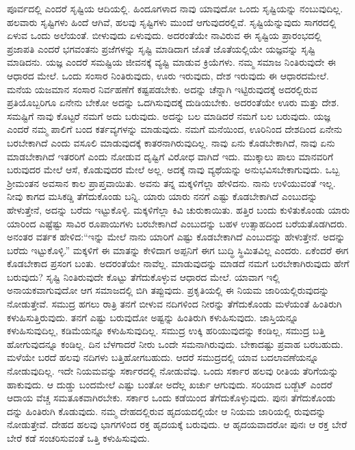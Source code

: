 ಪೂರ್ವದಲ್ಲಿ ಎಂದರೆ ಸೃಷ್ಟಿಯ ಆದಿಯಲ್ಲಿ. ಹಿಂದೂಗಳಾದ ನಾವು ಯಾವುದೋ ಒಂದು ಸೃಷ್ಟಿಯನ್ನು ನಂಬುವುದಿಲ್ಲ. ಹಲವಾರು ಸೃಷ್ಟಿಗಳು ಹಿಂದೆ ಆಗಿವೆ, ಹಲವು ಸೃಷ್ಟಿಗಳು ಮುಂದೆ ಆಗುವುದರಲ್ಲಿವೆ. ಸೃಷ್ಟಿಯೆನ್ನುವುದು ಸಾಗರದಲ್ಲಿ ಏಳುವ ಒಂದು ಅಲೆಯಂತೆ. ಬೀಳುವುದು ಏಳುವುದು. ಅದರಂತೆಯೇ ನಾವಿರುವ ಈ ಸೃಷ್ಟಿಯ ಪ್ರಾರಂಭದಲ್ಲಿ ಪ್ರಜಾಪತಿ ಎಂದರೆ ಭಗವಂತನು ಪ್ರಜೆಗಳನ್ನು ಸೃಷ್ಟಿ ಮಾಡಿದಾಗ ಜೊತೆ ಜೊತೆಯಲ್ಲಿಯೇ ಯಜ್ಞವನ್ನು ಸೃಷ್ಟಿ ಮಾಡಿದನು. ಯಜ್ಞ ಎಂದರೆ ಸಮಷ್ಟಿಯ ಜೀವನಕ್ಕೆ ವ್ಯಷ್ಟಿ ಮಾಡುವ ಕ್ರಿಯೆಗಳು. ನಮ್ಮ ಸಮಾಜ ನಿಂತಿರುವುದೇ ಈ ಆಧಾರದ ಮೇಲೆ. ಒಂದು ಸಂಸಾರ ನಿಂತಿರುವುದು, ಊರು ಇರುವುದು, ದೇಶ ಇರುವುದು ಈ ಆಧಾರದಮೇಲೆ. ಮನೆಯ ಯಜಮಾನ ಸಂಸಾರ ನಿರ್ವಹಣೆಗೆ ಕಷ್ಟಪಡಬೇಕು. ಅದನ್ನು ಚೆನ್ನಾಗಿ ಇಟ್ಟಿರುವುದಕ್ಕೆ ಅದರಲ್ಲಿರುವ ಪ್ರತಿಯೊಬ್ಬರಿಗೂ ಏನೇನು ಬೇಕೋ ಅದನ್ನು ಒದಗಿಸುವುದಕ್ಕೆ ದುಡಿಯಬೇಕು. ಅದರಂತೆಯೇ ಊರು ಮತ್ತು ದೇಶ. ಸಮಷ್ಟಿಗೆ ನಾವು ಕೊಟ್ಟರೆ ನಮಗೆ ಅದು ಬರುವುದು. ಅದನ್ನು ಬಲ ಮಾಡಿದರೆ ನಮಗೆ ಬಲ ಬರುವುದು. ಯಜ್ಞ ಎಂದರೆ ನಮ್ಮ ಪಾಲಿಗೆ ಬಂದ ಕರ್ತವ್ಯಗಳನ್ನು ಮಾಡುವುದು. ನಮಗೆ ಮನೆಯಿಂದ, ಊರಿನಿಂದ ದೇಶದಿಂದ ಏನೇನು ಬರಬೇಕಾಗಿದೆ ಎಂದು ವಸೂಲಿ ಮಾಡುವುದಕ್ಕೆ ಕಾತರನಾಗಿರುವುದಿಲ್ಲ. ನಾವು ಏನು ಕೊಡಬೇಕಾಗಿದೆ, ನಾವು ಏನು ಮಾಡಬೇಕಾಗಿದೆ ಇತರರಿಗೆ ಎಂದು ನೋಡುವ ದೃಷ್ಟಿಗೆ ವಿರೋಧ ವಾಗಿದೆ ಇದು. ಮುಕ್ಕಾಲು ಪಾಲು ಮಾನವರಿಗೆ ಬರುವುದರ ಮೇಲೆ ಆಸೆ, ಕೊಡುವುದರ ಮೇಲೆ ಅಲ್ಲ. ಅದಕ್ಕೆ ನಾವು ವ್ಯಥೆಯನ್ನು ಅನುಭವಿಸಬೇಕಾಗುವುದು. ಒಬ್ಬ ಶ್ರೀಮಂತನ ಅವಸಾನ ಕಾಲ ಪ್ರಾಪ್ತವಾಯಿತು. ಅವನು ತನ್ನ ಮಕ್ಕಳಿಗೆಲ್ಲಾ ಹೇಳಿದನು. ನಾನು ಉಳಿಯುವಂತೆ ಇಲ್ಲ. ನೀವು ಕಾಗದ ಮಸಿಕಡ್ಡಿ ತೆಗೆದುಕೊಂಡು ಬನ್ನಿ. ಯಾರು ಯಾರು ನನಗೆ ಎಷ್ಟು ಕೊಡಬೇಕಾಗಿದೆ ಎಂಬುದನ್ನು ಹೇಳುತ್ತೇನೆ, ಅದನ್ನು ಬರೆದು ಇಟ್ಟುಕೊಳ್ಳಿ. ಮಕ್ಕಳಿಗೆಲ್ಲಾ ಕಿವಿ ಚುರುಕಾಯಿತು. ಹತ್ತಿರ ಬಂದು ಕುಳಿತುಕೊಂಡು ಯಾರು ಯಾರಿಂದ ಎಷ್ಟೆಷ್ಟು ಸಾವಿರ ರೂಪಾಯಿಗಳು ಬರಬೇಕಾಗಿದೆ ಎಂಬುದನ್ನು ಬಹಳ ಉತ್ಸಾಹದಿಂದ ಬರೆಯತೊಡಗಿದರು. ಅನಂತರ ವರ್ತಕ ಹೇಳಿದ:“ಇನ್ನು ಮೇಲೆ ನಾನು ಯಾರಿಗೆ ಎಷ್ಟು ಕೊಡಬೇಕಾಗಿದೆ ಎಂಬುದನ್ನು ಹೇಳುತ್ತೇನೆ. ಅದನ್ನು ಬರೆದು ಇಟ್ಟುಕೊಳ್ಳಿ.” ಮಕ್ಕಳಿಗೆ ಈ ಮಾತನ್ನು ಕೇಳಿದಾಗ ಅಪ್ಪನಿಗೆ ಈಗ ಬುದ್ಧಿ ಸ್ಥಿಮಿತವಿಲ್ಲ ಎಂದರು. ಏಕೆಂದರೆ ಈಗ ಕೊಡಬೇಕಾದ ಪ್ರಸಂಗ ಬಂತು. ಅದರಂತೆಯೇ ನಾವೆಲ್ಲ. ಮಾಡುವುದನ್ನು ಮಾಡದೆ ನಮಗೆ ಬರಬೇಕಾಗಿರುವುದು ಹೇಗೆ ಬರುವುದು? ಸೃಷ್ಟಿ ನಿಂತಿರುವುದೇ ಕೊಟ್ಟು ತೆಗೆದುಕೊಳ್ಳುವ ಆಧಾರದ ಮೇಲೆ. ಯಾವಾಗ ಇಲ್ಲಿ ಅನಾಯಕವಾಗುವುದೋ ಆಗ ಸಮಾಜದಲ್ಲಿ ಬಿಗಿ ತಪ್ಪುವುದು. ಪ್ರಕೃತಿಯಲ್ಲಿ ಈ ನಿಯಮ ಜಾರಿಯಲ್ಲಿರುವುದನ್ನು ನೋಡುತ್ತೇವೆ. ಸಮುದ್ರ ಹಗಲು ರಾತ್ರಿ ತನಗೆ ಬೀಳುವ ನದಿಗಳಿಂದ ನೀರನ್ನು ತೆಗೆದುಕೊಂಡು ಮಳೆಯಂತೆ ಹಿಂತಿರುಗಿ ಕಳುಹಿಸುತ್ತಿರುವುದು. ತನಗೆ ಎಷ್ಟು ಬರುವುದೋ ಅಷ್ಟನ್ನು ಹಿಂತಿರುಗಿ ಕಳುಹಿಸುವುದು. ಜಾಸ್ತಿಯನ್ನೂ ಕಳುಹಿಸುವುದಿಲ್ಲ, ಕಡಿಮೆಯನ್ನೂ ಕಳುಹಿಸುವುದಿಲ್ಲ. ಸಮುದ್ರ ಉಕ್ಕಿ ಹರಿಯುವುದನ್ನು ಕಂಡಿಲ್ಲ, ಸಮುದ್ರ ಬತ್ತಿ ಹೋಗುವುದನ್ನೂ ಕಂಡಿಲ್ಲ. ದಿನ ಬೆಳಗಾದರೆ ನೀರು ಒಂದೇ ಸಮನಾಗಿರುವುದು. ಬೇಕಾದಷ್ಟು ಪ್ರವಾಹ ಬರಬಹುದು. ಮಳೆಯೇ ಬರದೆ ಹಲವು ನದಿಗಳು ಬತ್ತಿಹೋಗಬಹುದು. ಆದರೆ ಸಮುದ್ರದಲ್ಲಿ ಯಾವ ಬದಲಾವಣೆಯನ್ನೂ ನೋಡುವುದಿಲ್ಲ. ಇದೇ ನಿಯಮವನ್ನು ಸರ್ಕಾರದಲ್ಲಿ ನೋಡುವೆವು. ಒಂದು ಸರ್ಕಾರ ಹಲವು ರೀತಿಯ ತೆರಿಗೆಯನ್ನು ಹಾಕುವುದು. ಆ ದುಡ್ಡು ಬಂದಮೇಲೆ ಎಷ್ಟು ಬಂತೋ ಅದೆಲ್ಲ ಖರ್ಚು ಆಗುವುದು. ಸರಿಯಾದ ಬಡ್ಜೆಟ್ ಎಂದರೆ ಆದಾಯ ವೆಚ್ಚ ಸಮತೂಕವಾಗಿರಬೇಕು. ಸರ್ಕಾರ ಒಂದು ಕಡೆಯಿಂದ ತೆಗೆದುಕೊಳ್ಳುವುದು. ಪುನಃ ತೆಗೆದುಕೊಂಡು ದನ್ನು ಹಿಂತಿರುಗಿ ಕೊಡುವುದು. ನಮ್ಮ ದೇಹದಲ್ಲಿರುವ ಹೃದಯದಲ್ಲಿಯೇ ಆ ನಿಯಮ ಜಾರಿಯಲ್ಲಿ ರುವುದನ್ನು ನೋಡುತ್ತೇವೆ. ದೇಹದ ಹಲವು ಭಾಗಗಳಿಂದ ರಕ್ತ ಹೃದಯಕ್ಕೆ ಬರುವುದು. ಆ ಹೃದಯವಾದರೋ ಪುನಃ ಆ ರಕ್ತ ಬೇರೆ ಬೇರೆ ಕಡೆ ಸಂಚರಿಸುವಂತೆ ಒತ್ತಿ ಕಳುಹಿಸುವುದು.

